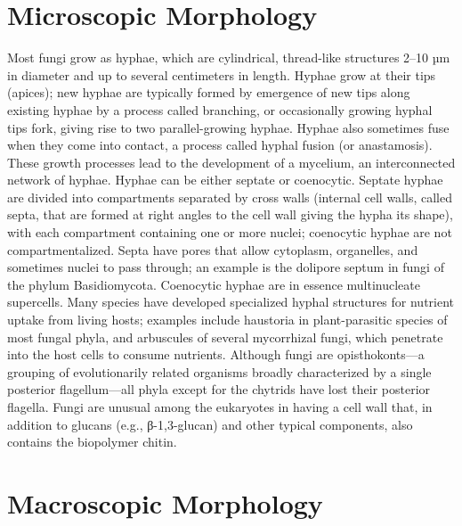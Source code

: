 \section{Microscopic Morphology}\label{microscopic-morphology}

Most fungi grow as hyphae, which are cylindrical, thread-like structures
2--10 µm in diameter and up to several centimeters in length. Hyphae
grow at their tips (apices); new hyphae are typically formed by
emergence of new tips along existing hyphae by a process called
branching, or occasionally growing hyphal tips fork, giving rise to two
parallel-growing hyphae. Hyphae also sometimes fuse when they come into
contact, a process called hyphal fusion (or anastamosis). These growth
processes lead to the development of a mycelium, an interconnected
network of hyphae. Hyphae can be either septate or coenocytic. Septate
hyphae are divided into compartments separated by cross walls (internal
cell walls, called septa, that are formed at right angles to the cell
wall giving the hypha its shape), with each compartment containing one
or more nuclei; coenocytic hyphae are not compartmentalized. Septa have
pores that allow cytoplasm, organelles, and sometimes nuclei to pass
through; an example is the dolipore septum in fungi of the phylum
Basidiomycota. Coenocytic hyphae are in essence multinucleate
supercells. Many species have developed specialized hyphal structures
for nutrient uptake from living hosts; examples include haustoria in
plant-parasitic species of most fungal phyla, and arbuscules of several
mycorrhizal fungi, which penetrate into the host cells to consume
nutrients. Although fungi are opisthokonts---a grouping of
evolutionarily related organisms broadly characterized by a single
posterior flagellum---all phyla except for the chytrids have lost their
posterior flagella. Fungi are unusual among the eukaryotes in having a
cell wall that, in addition to glucans (e.g., β-1,3-glucan) and other
typical components, also contains the biopolymer chitin.

\section{Macroscopic Morphology}\label{macroscopic-morphology}

